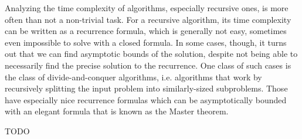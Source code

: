 Analyzing the time complexity of algorithms, especially recursive ones, is more often 
than not a non-trivial task. For a recursive algorithm, its time complexity can be 
written as a recurrence formula, which is generally not easy, sometimes even impossible 
to solve with a closed formula. In some cases, though, it turns out that we can find 
asymptotic bounds of the solution, despite not being able to necessarily find the 
precise solution to the recurrence. One class of such cases is the class of 
divide-and-conquer algorithms, i.e. algorithms that work by recursively splitting the input 
problem into similarly-sized subproblems. Those have especially nice recurrence formulas 
which can be asymptotically bounded with an elegant formula that is known as the Master theorem.

\begin{theorem}
TODO
\end{theorem}
